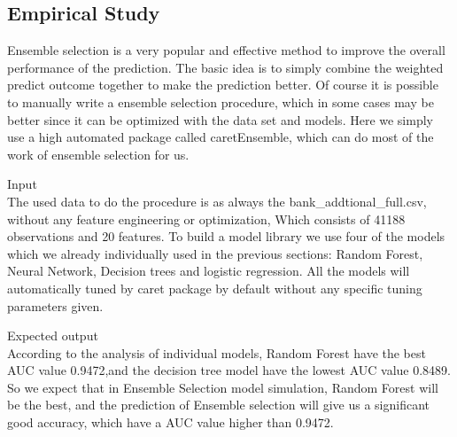 \documentclass[12pt, a4paper, bibliography=totoc, english]{scrartcl}
\begin{document}
\subsection{Empirical Study}
Ensemble selection is a very popular and effective method to improve the overall performance of the prediction. The basic idea is to simply combine the weighted predict outcome together to make the prediction better. Of course it is possible to manually write a ensemble selection procedure, which in some cases may be better since it can be optimized with the data set and models. Here we simply use a high automated package called caretEnsemble, which can do most of the work of ensemble selection for us.\indent

\textbullet\quad Input\\
The used data to do the procedure is as always the bank\_addtional\_full.csv, without any feature engineering or optimization, Which consists of 41188 observations and 20 features. To build a model library we use four of the models which we already individually used in the previous sections: Random Forest, Neural Network, Decision trees and logistic regression. All the models will automatically tuned by caret package by default without any specific tuning parameters given.\indent

\textbullet\quad Expected output \\
According to the analysis of individual models, Random Forest have the best AUC value 0.9472,and the decision tree model have the lowest AUC value 0.8489. So we expect that in Ensemble Selection model simulation, Random Forest will be the best, and the prediction of Ensemble selection will give us a significant good accuracy, which have a AUC value higher than 0.9472.
\end{document}
